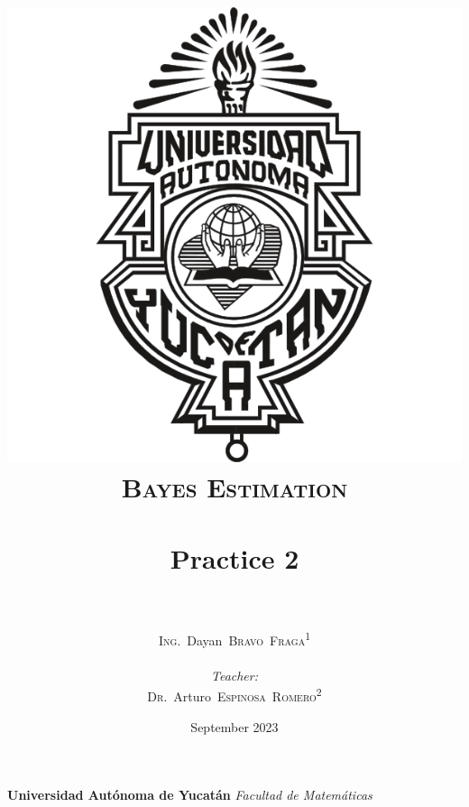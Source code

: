 \documentclass[24pt]{article}
\title{
    \includegraphics[scale=.1]{./img/logo_uady}\\
    \normalfont \large \textsc{Bayes Estimation} \\ [0.3cm]
    \HRule \\[0.3cm]
    \Large \bfseries Practice 2 \\
    \HRule \\[0.3cm]
}
\author{
    \textsc{Ing.}~Dayan~\textsc{Bravo~Fraga}\textsuperscript{1}\\
    \vspace{.1cm}\\
    \emph{Teacher:}\\
    \authorcr\textsc{Dr.}~Arturo~\textsc{Espinosa~Romero}\textsuperscript{2}\\
}
\date{September 2023}
\begin{document}
    \maketitle
    \begin{center}
        \textbf{Universidad Autónoma de Yucatán} \textit{Facultad de Matemáticas}\\
    \end{center}
\end{document}
